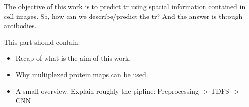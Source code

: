 The objective of this work is to predict \gls{tr} using spacial information contained in cell images. So, how can we describe/predict the \gls{tr}? And the answer is through antibodies.

This part should contain:
\begin{itemize}
  \item Recap of what is the aim of this work.
  \item Why multiplexed protein maps can be used.
  \item A small overview. Explain roughly the pipline: Preprocessing -> TDFS -> CNN
\end{itemize}
